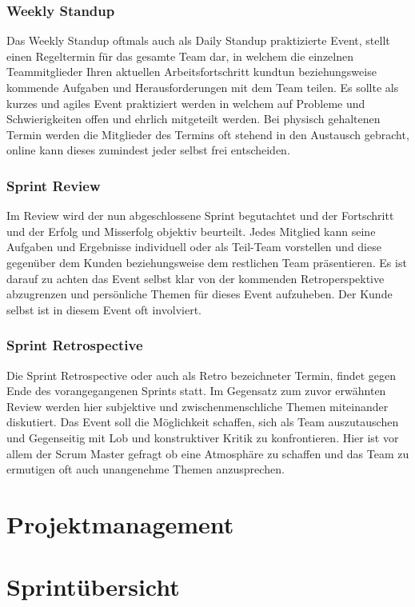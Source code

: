 \subsubsection{Weekly Standup}
Das Weekly Standup oftmals auch als Daily Standup praktizierte Event, stellt einen Regeltermin für das gesamte Team dar, in welchem die einzelnen Teammitglieder Ihren aktuellen Arbeitsfortschritt kundtun beziehungsweise kommende Aufgaben und Herausforderungen mit dem Team teilen. Es sollte als kurzes und agiles Event praktiziert werden in welchem auf Probleme und Schwierigkeiten offen und ehrlich mitgeteilt werden. Bei physisch gehaltenen Termin werden die Mitglieder des Termins oft stehend in den Austausch gebracht, online kann dieses zumindest jeder selbst frei entscheiden.

\subsubsection{Sprint Review}
Im Review wird der nun abgeschlossene Sprint begutachtet und der Fortschritt und der Erfolg und Misserfolg objektiv beurteilt. Jedes Mitglied kann seine Aufgaben und Ergebnisse individuell oder als Teil-Team vorstellen und diese gegenüber dem Kunden beziehungsweise dem restlichen Team präsentieren. Es ist darauf zu achten das Event selbst klar von der kommenden Retroperspektive abzugrenzen und persönliche Themen für dieses Event aufzuheben. Der Kunde selbst ist in diesem Event oft involviert.


\subsubsection{Sprint Retrospective}
Die Sprint Retrospective oder auch als Retro bezeichneter Termin, findet gegen Ende des vorangegangenen Sprints statt. Im Gegensatz zum zuvor erwähnten Review werden hier subjektive und zwischenmenschliche Themen miteinander diskutiert. Das Event soll die Möglichkeit schaffen, sich als Team auszutauschen und Gegenseitig mit Lob und konstruktiver Kritik zu konfrontieren. Hier ist vor allem der Scrum Master gefragt ob eine Atmosphäre zu schaffen und das Team zu ermutigen oft auch unangenehme Themen anzusprechen.

\section{Projektmanagement}
\label{sec:projectmanagement}


\section{Sprintübersicht}
\label{sec:sprintoverview}


